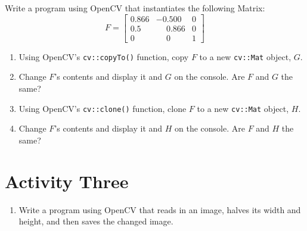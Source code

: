 \documentclass[12pt, A4]{article}
\begin{document}
Write a program using OpenCV that instantiates the following Matrix:
\begin{equation*}
    F = 
    \begin{bmatrix}
        0.866 & -0.500 & 0\\
        0.5 & \phantom{-}0.866 & 0\\
        0 & \phantom{-}0 & 1
    \end{bmatrix}
\end{equation*}

\begin{enumerate}[label=(\alph*)]

    \item Using OpenCV's \lstinline!cv::copyTo()! function, copy $F$ to a new \lstinline!cv::Mat! object, $G$. 

    \item Change $F$'s contents and display it and $G$ on the console. Are $F$ and $G$ the same?

    \item Using OpenCV's \lstinline!cv::clone()! function, clone $F$ to a new \lstinline!cv::Mat! object, $H$. 

    \item Change $F$'s contents and display it and $H$ on the console. Are $F$ and $H$ the same?
    
\end{enumerate}

\section*{Activity Three}

\begin{enumerate}[label=(\alph*)]
    
    \item Write a program using OpenCV that reads in an image, halves its width and height, and then saves the changed image.

\end{enumerate}
\end{document}
